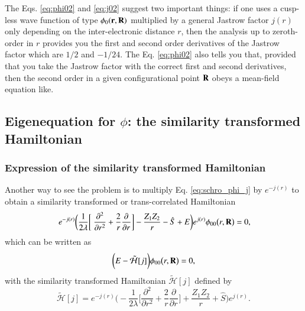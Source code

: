 \documentclass[aip,jcp,reprint,noshowkeys,superscriptaddress]{revtex4-1}
\newcommand{\deriv}[3]{\frac{\partial^{#3} #1}{\partial {#2}^{#3}}}
\newcommand{\bd}[1]{{\bf {#1}}}
\begin{document}
The Eqs. \eqref{eq:phi02} and \eqref{eq:j02} suggest two important things: if one uses a cusp-less wave function of type $\phi_0(\bd{r},\bd{R})$ multiplied by a general Jastrow factor $j(r)$ only depending on the inter-electronic distance $r$, then the analysis up to zeroth-order in $r$ provides you the first and second order derivatives of the Jastrow factor which are $1/2$ and $-1/24$. 
The Eq. \eqref{eq:phi02} also tells you that, provided that you take the Jastrow factor with the correct first and second derivatives, then the second order in a given configurational point $\bd{R}$ obeys a mean-field equation like. 


\subsection{Eigenequation for $\phi$: the similarity transformed Hamiltonian}
\subsubsection{Expression of the similarity transformed Hamiltonian}
Another way to see the problem is to multiply Eq. \eqref{eq:schro_phi_j} by $e^{-j(r)}$ to obtain a similarity transformed or trans-correlated Hamiltonian
\begin{equation}
 \label{eq:schro_tilde_phi_j}
 \begin{aligned}
 e^{-j(r)} \bigg( \frac{1}{2\lambda} \bigg[ \deriv{}{r}{2} + \frac{2}{r} \deriv{}{r}{}\bigg] - \frac{Z_1 Z_2}{r}  - \hat{S} + E \bigg) e^{j(r)}\phi_{00}\big(r,\bd{R}\big) =0, 
 \end{aligned}
\end{equation}
which can be written as 
\begin{equation}
 \label{eq:htilde_phi}
 \bigg(E -\tilde{\mathcal{H}}[j]\bigg) \phi_{00}\big(r,\bd{R}\big) = 0,
\end{equation}
with the similarity transformed Hamiltonian $ \tilde{\mathcal{H}}[j] $ defined by
\begin{equation}
  \tilde{\mathcal{H}}[j]  = e^{-j(r)} \bigg( -\frac{1}{2\lambda} \bigg[ \deriv{}{r}{2} + \frac{2}{r} \deriv{}{r}{}\bigg] 
+ \frac{Z_1 Z_2}{r}  + \hat{S}  \bigg) e^{j(r)}.
\end{equation}
\end{document}
